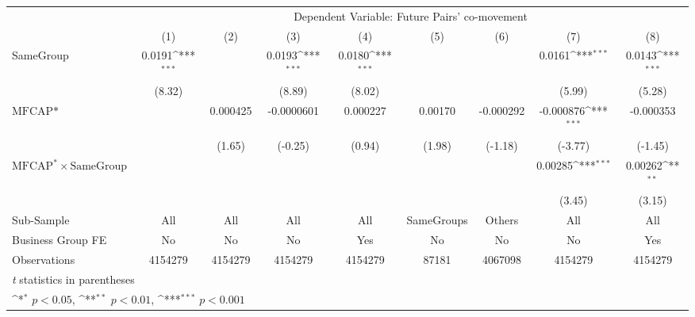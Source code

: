 {
\def\sym#1{\ifmmode^{#1}\else\(^{#1}\)\fi}
\begin{tabular}{l*{8}{c}}
\hline\hline
                &\multicolumn{8}{c}{Dependent Variable: Future Pairs' co-movement}                                                                                      \\\cmidrule(lr){2-9}
                &\multicolumn{1}{c}{(1)}         &\multicolumn{1}{c}{(2)}         &\multicolumn{1}{c}{(3)}         &\multicolumn{1}{c}{(4)}         &\multicolumn{1}{c}{(5)}         &\multicolumn{1}{c}{(6)}         &\multicolumn{1}{c}{(7)}         &\multicolumn{1}{c}{(8)}         \\
\hline
SameGroup       &   0.0191\sym{***}&                  &   0.0193\sym{***}&   0.0180\sym{***}&                  &                  &   0.0161\sym{***}&   0.0143\sym{***}\\
                &   (8.32)         &                  &   (8.89)         &   (8.02)         &                  &                  &   (5.99)         &   (5.28)         \\
[1em]
$ \text{MFCAP*} $&                  & 0.000425         &-0.0000601         & 0.000227         &  0.00170         &-0.000292         &-0.000876\sym{***}&-0.000353         \\
                &                  &   (1.65)         &  (-0.25)         &   (0.94)         &   (1.98)         &  (-1.18)         &  (-3.77)         &  (-1.45)         \\
[1em]
 $ \text{MFCAP}^* \times {\text{SameGroup} }  $ &                  &                  &                  &                  &                  &                  &  0.00285\sym{***}&  0.00262\sym{**} \\
                &                  &                  &                  &                  &                  &                  &   (3.45)         &   (3.15)         \\
\hline
Sub-Sample      &      All         &      All         &      All         &      All         &SameGroups         &   Others         &      All         &      All         \\
Business Group FE&       No         &       No         &       No         &      Yes         &       No         &       No         &       No         &      Yes         \\
Observations    &  4154279         &  4154279         &  4154279         &  4154279         &    87181         &  4067098         &  4154279         &  4154279         \\
\hline\hline
\multicolumn{9}{l}{\footnotesize \textit{t} statistics in parentheses}\\
\multicolumn{9}{l}{\footnotesize \sym{*} \(p<0.05\), \sym{**} \(p<0.01\), \sym{***} \(p<0.001\)}\\
\end{tabular}
}
